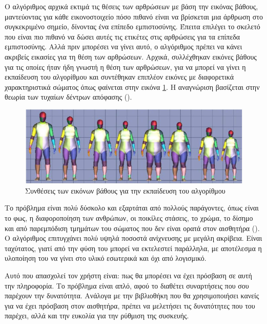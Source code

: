 Ο αλγόριθμος αρχικά εκτιμά τις θέσεις των αρθρώσεων με βάση την εικόνας βάθους, μαντεύοντας για κάθε εικονοστοιχείο πόσο πιθανό είναι να βρίσκεται μια άρθρωση στο συγκεκριμένο σημείο, δίνοντας ένα επίπεδο εμπιστοσύνης. Έπειτα επιλέγει το σκελετό που είναι πιο πιθανό να δώσει αυτές τις ετικέτες στις αρθρώσεις για τα επίπεδα εμπιστοσύνης. Αλλά πριν μπορέσει να γίνει αυτό, ο αλγόριθμος πρέπει να κάνει ακριβείς εικασίες για τη θέση των αρθρώσεων. Αρχικά, συλλέχθηκαν εικόνες βάθους για τις οποίες ήταν ήδη γνωστή η θέση των αρθρώσεων, για να μπορεί να γίνει η εκπαίδευση του αλγορίθμου και συντέθηκαν επιπλέον εικόνες με διαφορετικά χαρακτηριστικά σώματος όπως φαίνεται στην εικόνα \ref{fig:kinect-data-synthesis}. Η αναγνώριση βασίζεται στην θεωρία των τυχαίων δέντρων απόφασης ().

\begin{figure}[H]
    \centering
    \includegraphics[width=.9\textwidth]{kinect/fig/kinect-data-synthesis.png}
    \caption{Συνθέσεις των εικόνων βάθους για την εκπαίδευση του αλγορίθμου\cite{shotton11}}
    \label{fig:kinect-data-synthesis}
\end{figure}

Το πρόβλημα είναι πολύ δύσκολο και εξαρτάται από πολλούς παράγοντες, όπως είναι το φως, η διαφοροποίηση των ανθρώπων, οι ποικίλες στάσεις, το χρώμα, το δίσημο και από παρεμπόδιση τμημάτων του σώματος που δεν είναι ορατά στον αισθητήρα (). Ο αλγόριθμος επιτυγχάνει πολύ υψηλά ποσοστά ανίχνευσης με μεγάλη ακρίβεια. Είναι ταχύτατος, γιατί από την φύση του μπορεί να εκτελεστεί παράλληλα, με αποτέλεσμα η υλοποίηση του να γίνει στο υλικό εσωτερικά και όχι από λογισμικό.

Αυτό που απασχολεί τον χρήστη είναι: πως θα μπορέσει να έχει πρόσβαση σε αυτή την πληροφορία. Το πρόβλημα είναι απλό, αφού το  διαθέτει συναρτήσεις που σου παρέχουν την δυνατότητα. Ανάλογα με την βιβλιοθήκη που θα χρησιμοποιήσει κανείς για να έχει πρόσβαση στον αισθητήρα, πρέπει να μελετήσει τις δυνατότητες που του παρέχει, αλλά και την ευκολία για την ρύθμιση της συσκευής.

